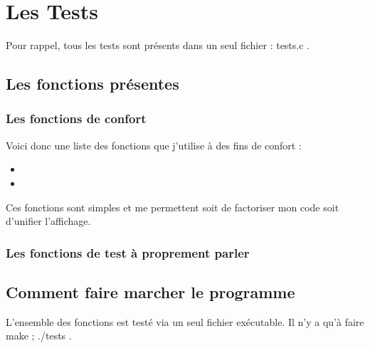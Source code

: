 \chapter{Les Tests}

Pour rappel, tous les tests sont présents dans un seul fichier : tests.c .


\section{Les fonctions présentes}

\subsection{Les fonctions de confort}

Voici donc une liste des fonctions que j'utilise à des fins de confort : 
\begin{itemize}
	\item
	\item
\end{itemize}

Ces fonctions sont simples et me permettent soit de factoriser mon code soit d'unifier l'affichage.

\subsection{Les fonctions de test à proprement parler}

\section{Comment faire marcher le programme}

L'ensemble des fonctions est testé via un seul fichier exécutable. Il n'y a qu'à faire make ; ./tests .

\clearpage
